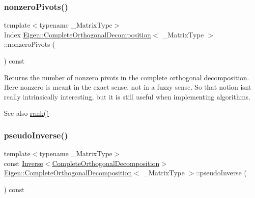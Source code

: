 \subsubsection{\texorpdfstring{nonzeroPivots()}{nonzeroPivots()}}
{\footnotesize\ttfamily template$<$typename \+\_\+\+Matrix\+Type$>$ \\
Index \mbox{\hyperlink{class_eigen_1_1_complete_orthogonal_decomposition}{Eigen\+::\+Complete\+Orthogonal\+Decomposition}}$<$ \+\_\+\+Matrix\+Type $>$\+::nonzero\+Pivots (\begin{DoxyParamCaption}{ }\end{DoxyParamCaption}) const\hspace{0.3cm}{\ttfamily [inline]}}

\begin{DoxyReturn}{Returns}
the number of nonzero pivots in the complete orthogonal decomposition. Here nonzero is meant in the exact sense, not in a fuzzy sense. So that notion isn\textquotesingle{}t really intrinsically interesting, but it is still useful when implementing algorithms.
\end{DoxyReturn}
\begin{DoxySeeAlso}{See also}
\mbox{\hyperlink{class_eigen_1_1_complete_orthogonal_decomposition_af348f64b26f8467a020062c22b748806}{rank()}} 
\end{DoxySeeAlso}
\mbox{\label{class_eigen_1_1_complete_orthogonal_decomposition_a3c89639299720ce089435d26d6822d6f}} 
\subsubsection{\texorpdfstring{pseudoInverse()}{pseudoInverse()}}
{\footnotesize\ttfamily template$<$typename \+\_\+\+Matrix\+Type$>$ \\
const \mbox{\hyperlink{class_eigen_1_1_inverse}{Inverse}}$<$\mbox{\hyperlink{class_eigen_1_1_complete_orthogonal_decomposition}{Complete\+Orthogonal\+Decomposition}}$>$ \mbox{\hyperlink{class_eigen_1_1_complete_orthogonal_decomposition}{Eigen\+::\+Complete\+Orthogonal\+Decomposition}}$<$ \+\_\+\+Matrix\+Type $>$\+::pseudo\+Inverse (\begin{DoxyParamCaption}{ }\end{DoxyParamCaption}) const\hspace{0.3cm}{\ttfamily [inline]}}

